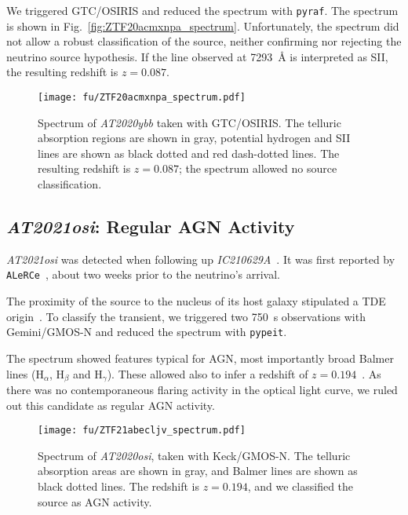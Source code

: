 We triggered GTC/OSIRIS and reduced the spectrum with \texttt{pyraf}. The spectrum is shown in Fig.~\ref{fig:ZTF20acmxnpa_spectrum}. Unfortunately, the spectrum did not allow a robust classification of the source, neither confirming nor rejecting the neutrino source hypothesis. If the line observed at \SI{7293}{\angstrom} is interpreted as SII, the resulting redshift is $z=0.087$.

\begin{figure}[htb]
    \texttt{[image: fu/ZTF20acmxnpa\_spectrum.pdf]}
    \caption[\emph{AT2020ybb} spectrum]{Spectrum of \emph{AT2020ybb} taken with GTC/OSIRIS. The telluric absorption regions are shown in gray, potential hydrogen and SII lines are shown as black dotted and red dash-dotted lines. The resulting redshift is $z=0.087$; the spectrum allowed no source classification.}
\end{figure}

\subsection{\emph{AT2021osi}: Regular AGN Activity}
\emph{AT2021osi} was detected when following up \emph{IC210629A}~. It was first reported by \texttt{ALeRCe}~, about two weeks prior to the neutrino's arrival.

The proximity of the source to the nucleus of its host galaxy stipulated a TDE origin~. To classify the transient, we triggered two \SI{750}{\second} observations with Gemini/GMOS-N and reduced the spectrum with \texttt{pypeit}.

The spectrum showed features typical for AGN, most importantly broad Balmer lines ($\text{H}_\alpha$, $\text{H}_\beta$ and $\text{H}_\gamma$). These allowed also to infer a redshift of $z=0.194$~. As there was no contemporaneous flaring activity in the optical light curve, we ruled out this candidate as regular AGN activity.

\begin{figure}[htb]
    \texttt{[image: fu/ZTF21abecljv\_spectrum.pdf]}
    \caption[\emph{AT2020osi} spectrum]{Spectrum of \emph{AT2020osi}, taken with Keck/GMOS-N. The telluric absorption areas are shown in gray, and Balmer lines are shown as black dotted lines. The redshift is $z= 0.194$, and we classified the source as AGN activity.}
\end{figure}

